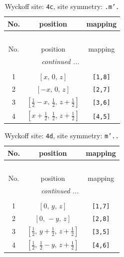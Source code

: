 \documentclass[fleqn,8pt]{jsarticle}
\begin{document}
\renewcommand{\arraystretch}{1.2}
\begin{longtable}{ccc}
\caption{Wyckoff site: {\tt 4c}, site symmetry: {\tt .m'.}}
 \\
 \hline \hline
No. & position & mapping \\ \hline \endfirsthead

\multicolumn{2}{l}{\tablename\ \thetable{}} \\
 \hline \hline
No. & position & mapping \\ \hline \endhead

 \hline \hline
\multicolumn{2}{r}{\footnotesize\it continued ...} \\ \endfoot

 \hline \hline
\multicolumn{2}{r}{} \\ \endlastfoot

1 & $\left[ x,\, 0,\, z \right]$ & {\tt [1,8]} \\ \hline
2 & $\left[ - x,\, 0,\, z \right]$ & {\tt [2,7]} \\ \hline
3 & $\left[ \frac{1}{2} - x,\, \frac{1}{2},\, z + \frac{1}{2} \right]$ & {\tt [3,6]} \\ \hline
4 & $\left[ x + \frac{1}{2},\, \frac{1}{2},\, z + \frac{1}{2} \right]$ & {\tt [4,5]} \\
\end{longtable}
\renewcommand{\arraystretch}{1.2}
\begin{longtable}{ccc}
\caption{Wyckoff site: {\tt 4d}, site symmetry: {\tt m'..}}
 \\
 \hline \hline
No. & position & mapping \\ \hline \endfirsthead

\multicolumn{2}{l}{\tablename\ \thetable{}} \\
 \hline \hline
No. & position & mapping \\ \hline \endhead

 \hline \hline
\multicolumn{2}{r}{\footnotesize\it continued ...} \\ \endfoot

 \hline \hline
\multicolumn{2}{r}{} \\ \endlastfoot

1 & $\left[ 0,\, y,\, z \right]$ & {\tt [1,7]} \\ \hline
2 & $\left[ 0,\, - y,\, z \right]$ & {\tt [2,8]} \\ \hline
3 & $\left[ \frac{1}{2},\, y + \frac{1}{2},\, z + \frac{1}{2} \right]$ & {\tt [3,5]} \\ \hline
4 & $\left[ \frac{1}{2},\, \frac{1}{2} - y,\, z + \frac{1}{2} \right]$ & {\tt [4,6]} \\
\end{longtable}
\end{document}
